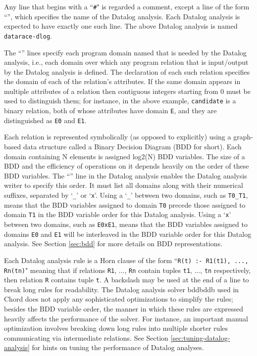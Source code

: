 Any line that begins with a ``{\tt \#}" is regarded a comment, except a
line of the form ``'', which specifies the name
 of the Datalog analysis.
Each Datalog analysis is expected to have exactly one such line.
The above Datalog analysis is named {\tt datarace-dlog}.

The ``'' lines specify each program domain named
 that is needed by the Datalog analysis, i.e., each domain over which
any program relation that is input/output by the Datalog analysis is defined. 
The declaration of each such relation specifies the domain of each of the relation's attributes.
If the same domain appears in multiple attributes of a relation then
contiguous integers starting from 0 must be used to distinguish them; for instance,
in the above example, {\tt candidate} is a binary relation, both of whose
attributes have domain {\tt E}, and they are distinguished as {\tt E0} and {\tt E1}.

Each relation is represented symbolically (as opposed to explicitly)
using a graph-based data structure called a Binary Decision Diagram (BDD for short).
Each domain containing N elements is assigned log2(N) BDD variables.
The size of a BDD and the efficiency of operations on it depends heavily
on the order of these BDD variables.
The ``'' line in the Datalog analysis enables the Datalog
analysis writer to specify this order.
It must list all domains along with their numerical suffixes, separated
by `{\tt \_}' or `{\tt x}'.
Using a `{\tt \_}' between two domains, such as {\tt T0\_T1}, means that the BDD variables assigned
to domain {\tt T0} precede those assigned to domain {\tt T1} in the BDD variable
order for this Datalog analysis.
Using a `{\tt x}' between two domains, such as {\tt E0xE1}, means that the
BDD variables assigned to domains {\tt E0} and {\tt E1}
will be interleaved in the BDD variable order for this Datalog analysis.
See Section \ref{sec:bdd} for more details on BDD representations.

Each Datalog analysis rule is a Horn clause of the form
``{\tt R(t) :- R1(t1), ..., Rn(tn)}"
meaning that if relations {\tt R1}, ..., {\tt Rn} contain tuples {\tt t1}, ..., {\tt tn}
respectively, then relation {\tt R} contains tuple {\tt t}.
A backslash may be used at the end of a line to break long rules for readability.
The Datalog analysis solver bddbddb used in Chord does not apply any
sophisticated optimizations to simplify the rules; besides the BDD variable order,
the manner in which these rules are expressed heavily affects the performance of
the solver.  For instance, an important manual optimization involves breaking down
long rules into multiple shorter rules communicating via intermediate relations.
See Section \ref{sec:tuning-datalog-analysis} for hints on tuning the performance
of Datalog analyses.

